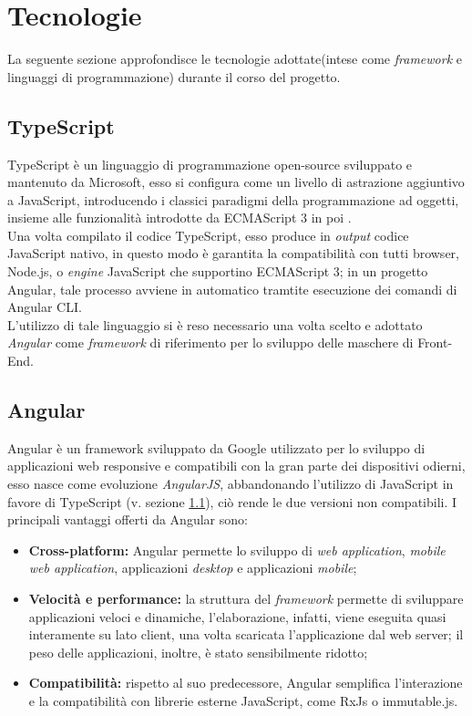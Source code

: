 \section{Tecnologie}
La seguente sezione approfondisce le tecnologie adottate(intese come \textit{framework} e linguaggi di programmazione) durante il corso del progetto.

\subsection{TypeScript}\label{typescript}
\gls{TypeScript} è un linguaggio di programmazione open-source sviluppato e mantenuto da Microsoft, esso si configura come un livello di astrazione aggiuntivo a \gls{JavaScript}, introducendo i classici paradigmi della programmazione ad oggetti, insieme alle funzionalità introdotte da ECMAScript 3 in poi .\\
Una volta compilato il codice TypeScript, esso produce in \textit{output} codice JavaScript nativo, in questo modo è garantita la compatibilità con tutti browser, \gls{Node.js}, o \textit{engine} JavaScript che supportino ECMAScript 3; in un progetto Angular, tale processo avviene in automatico tramtite esecuzione dei comandi di \gls{Angular CLI}.\\
L'utilizzo di tale linguaggio si è reso necessario una volta scelto e adottato \textit{Angular} come \textit{framework} di riferimento per lo sviluppo delle maschere di Front-End.\\

\subsection{Angular}
Angular è un framework sviluppato da Google utilizzato per lo sviluppo di applicazioni web responsive e compatibili con la gran parte dei dispositivi odierni, esso nasce come evoluzione \textit{AngularJS}, abbandonando l'utilizzo di JavaScript in favore di TypeScript (v. sezione \ref{typescript}), ciò rende le due versioni non compatibili.
I principali vantaggi offerti da Angular sono:
\begin{itemize}
	\item \textbf{Cross-platform:} Angular permette lo sviluppo di \textit{web application}, \textit{mobile web application}, applicazioni \textit{desktop} e applicazioni \textit{mobile};
	\item \textbf{Velocità e performance:} la struttura del \textit{framework} permette di sviluppare applicazioni veloci e dinamiche, l'elaborazione, infatti, viene eseguita quasi interamente su lato client, una volta scaricata l'applicazione dal \gls{web server}; il peso delle applicazioni, inoltre, è stato sensibilmente ridotto;
	\item \textbf{Compatibilità:} rispetto al suo predecessore, Angular semplifica l'interazione e la compatibilità con librerie esterne JavaScript, come \gls{RxJs} o \gls{immutable.js}.
\end{itemize}

